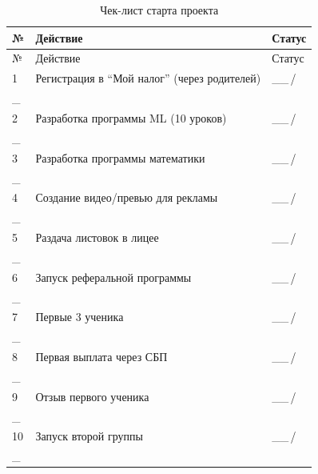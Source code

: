 \documentclass[12pt,a4paper]{article}
\begin{document}
\begin{longtable}{p{2cm}p{8cm}p{2cm}}
\caption{Чек-лист старта проекта}
\label{tab:checklist} \\
\toprule
№ & Действие & Статус \\
\midrule
\endfirsthead

\toprule
№ & Действие & Статус \\
\midrule
\endhead

1 & Регистрация в ``Мой налог'' (через родителей) & \_\_\,/\\_ \\
2 & Разработка программы ML (10 уроков) & \_\_\,/\\_ \\
3 & Разработка программы математики & \_\_\,/\\_ \\
4 & Создание видео/превью для рекламы & \_\_\,/\\_ \\
5 & Раздача листовок в лицее & \_\_\,/\\_ \\
6 & Запуск реферальной программы & \_\_\,/\\_ \\
7 & Первые 3 ученика & \_\_\,/\\_ \\
8 & Первая выплата через СБП & \_\_\,/\\_ \\
9 & Отзыв первого ученика & \_\_\,/\\_ \\
10 & Запуск второй группы & \_\_\,/\\_ \\
\bottomrule
\end{longtable}
\end{document}
